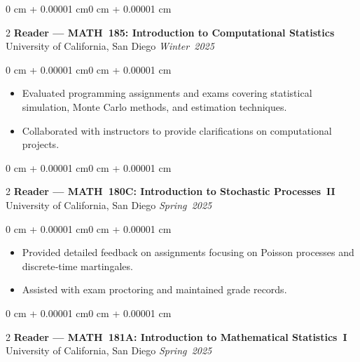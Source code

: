 \documentclass[10pt, letterpaper]{article}
\newenvironment{highlights}{\begin{itemize}[topsep=0.10 cm, parsep=0.10 cm, partopsep=0pt, itemsep=0pt, leftmargin=0 cm + 10pt]}{\end{itemize}}
\newenvironment{onecolentry}{\begin{adjustwidth}{0 cm + 0.00001 cm}{0 cm + 0.00001 cm}}{\end{adjustwidth}}
\newenvironment{twocolentry}[2][]{\onecolentry \def\secondColumn{#2} \setcolumnwidth{\fill, 4.5 cm} \begin{paracol}{2}}{\switchcolumn \raggedleft \secondColumn \end{paracol} \endonecolentry}
\begin{document}
    \vspace{0.15 cm}

    \begin{twocolentry}{\textit{Winter 2025}}
        \textbf{Reader — MATH 185: Introduction to Computational Statistics}\newline
        University of California, San Diego
    \end{twocolentry}

    \vspace{0.10 cm}
    \begin{onecolentry}
        \begin{highlights}
            \item Evaluated programming assignments and exams covering statistical simulation, Monte Carlo methods, and estimation techniques.
            \item Collaborated with instructors to provide clarifications on computational projects.
        \end{highlights}
    \end{onecolentry}

    \vspace{0.15 cm}

    \begin{twocolentry}{\textit{Spring 2025}}
        \textbf{Reader — MATH 180C: Introduction to Stochastic Processes II}\newline
        University of California, San Diego
    \end{twocolentry}

    \vspace{0.10 cm}
    \begin{onecolentry}
        \begin{highlights}
            \item Provided detailed feedback on assignments focusing on Poisson processes and discrete‑time martingales.
            \item Assisted with exam proctoring and maintained grade records.
        \end{highlights}
    \end{onecolentry}

    \vspace{0.15 cm}

    \begin{twocolentry}{\textit{Spring 2025}}
        \textbf{Reader — MATH 181A: Introduction to Mathematical Statistics I}\newline
        University of California, San Diego
    \end{twocolentry}
\end{document}
